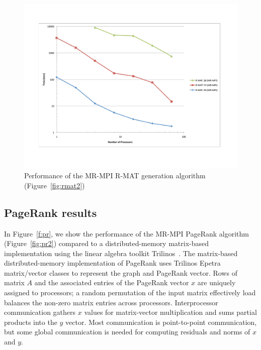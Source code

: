 \begin{figure}[htb]
\includegraphics[width=\textwidth]{fig_rmat.pdf}
\caption{Performance of the MR-MPI R-MAT generation algorithm (Figure~\ref{fig:rmat2}) 
}
\label{f:rmat}
\end{figure}

\subsection{PageRank results}
\label{subsec:results_pagerank}

In Figure~\ref{f:pr}, we show the performance of the MR-MPI PageRank
algorithm (Figure~\ref{fig:pr2}) compared to a distributed-memory
matrix-based implementation using the linear algebra toolkit
Trilinos~\cite{Trilinos-Overview}.  The matrix-based
distributed-memory implementation of PageRank uses Trilinos Epetra
matrix/vector classes to represent the graph and PageRank vector.
Rows of matrix $A$ and the associated entries of the PageRank vector
$x$ are uniquely assigned to processors; a random permutation of the
input matrix effectively load balances the non-zero matrix entries
across processors.  Interprocessor communication gathers $x$ values
for matrix-vector multiplication and sums partial products into the
$y$ vector.  Most communication is point-to-point communication, but
some global communication is needed for computing residuals and norms
of $x$ and $y$.

